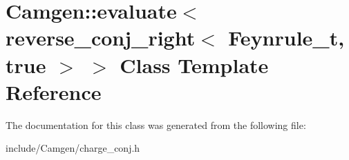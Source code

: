 \hypertarget{a00186}{\section{Camgen\-:\-:evaluate$<$ reverse\-\_\-conj\-\_\-right$<$ Feynrule\-\_\-t, true $>$ $>$ Class Template Reference}
\label{a00186}
}


The documentation for this class was generated from the following file\-:\begin{DoxyCompactItemize}
\item 
include/\-Camgen/charge\-\_\-conj.\-h\end{DoxyCompactItemize}

